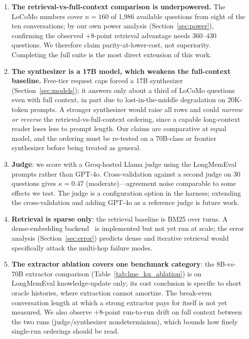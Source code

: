 \documentclass[conference]{IEEEtran}
\begin{document}
\begin{enumerate}
    \item \textbf{The retrieval-vs-full-context comparison is underpowered.} The LoCoMo numbers cover $n=160$ of 1{,}986 available questions from eight of the ten conversations; by our own power analysis (Section~\ref{sec:power}), confirming the observed $+8$-point retrieval advantage needs 360--430 questions. We therefore claim parity-at-lower-cost, not superiority. Completing the full suite is the most direct extension of this work.

    \item \textbf{The synthesizer is a 17B model, which weakens the full-context baseline.} Free-tier request caps forced a 17B synthesizer (Section~\ref{sec:models}); it answers only about a third of LoCoMo questions even with full context, in part due to lost-in-the-middle degradation on 20K-token prompts. A stronger synthesizer would raise all rows and could \emph{narrow or reverse} the retrieval-vs-full-context ordering, since a capable long-context reader loses less to prompt length. Our claims are comparative at equal model, and the ordering must be re-tested on a 70B-class or frontier synthesizer before being treated as general.

    \item \textbf{Judge}: we score with a Groq-hosted Llama judge using the LongMemEval prompts rather than GPT-4o. Cross-validation against a second judge on 30 questions gives $\kappa=0.47$ (moderate)---agreement noise comparable to some effects we test. The judge is a configuration option in the harness; extending the cross-validation and adding GPT-4o as a reference judge is future work.

    \item \textbf{Retrieval is sparse only}: the retrieval baseline is BM25 over turns. A dense-embedding backend~\cite{karpukhin2020dense} is implemented but not yet run at scale; the error analysis (Section~\ref{sec:error}) predicts dense and iterative retrieval would specifically attack the multi-hop failure modes.

    \item \textbf{The extractor ablation covers one benchmark category}: the 8B-vs-70B extractor comparison (Table~\ref{tab:lme_ku_ablation}) is on LongMemEval knowledge-update only; its cost conclusion is specific to short oracle histories, where extraction cannot amortize. The break-even conversation length at which a strong extractor pays for itself is not yet measured. We also observe $+8$-point run-to-run drift on full context between the two runs (judge/synthesizer nondeterminism), which bounds how finely single-run orderings should be read.


\end{enumerate}
\end{document}
